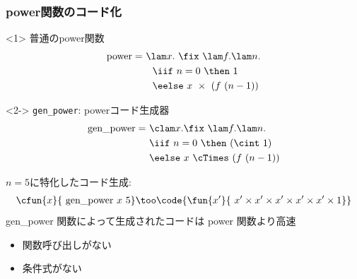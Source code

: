 \begin{frame}
  \frametitle{power関数のコード化}
  \begin{onlyenv}<1>
    普通のpower関数
    \begin{align*}
      \text{power} =~ &\lam x.~\fix~ \lam f. \lam n. \\
                      &~~\iif~ n=0~ \then~  1 \\
                      &~~\eelse~ x~ \times~ (f~ (n - 1))
    \end{align*}
  \end{onlyenv}

  \begin{onlyenv}<2->
    \texttt{gen\_power}: powerコード生成器
    \begin{align*}
      \text{gen\_power} =~ &\clam x. \fix~ \lam f. \lam n. \\
                           &\iif~ n=0~ \then~ (\cint~ 1) \\
                           &\eelse~ x~ \cTimes~ (f~ (n - 1))
    \end{align*}
  \end{onlyenv}

  \pause
  \pause
  $n = 5$に特化したコード生成:
  \pause
  \begin{align*}
    \cfun{x}{~\text{gen\_power}~ x~ 5} \too \code{\fun{x'}{~x' 
\times x' \times x' \times x' \times x' \times 1}}
  \end{align*}
  \pause
  gen\_power 関数によって生成されたコードは power 関数より高速
  \begin{itemize}
  \item 関数呼び出しがない
  \item 条件式がない
  \end{itemize}
\end{frame}




